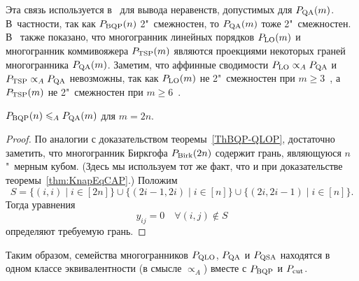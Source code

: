 Эта связь используется в~\cite{Kaibel:1997} для вывода неравенств, допустимых для $P_{\textup{QA}}(m)$.
В~частности, так как $P_{\textup{BQP}}(n)$ 2"~смежностен, то $P_{\textup{QA}}(m)$ тоже 2"~смежностен.
В~\cite{Kaibel:1997} также показано, что многогранник линейных порядков $P_{\textup{LO}}(m)$ и многогранник коммивояжера $P_{\textup{TSP}}(m)$ являются проекциями некоторых граней многогранника $P_{\textup{QA}}(m)$.
Заметим, что аффинные сводимости $P_{\textup{LO}} \propto_A P_{\textup{QA}}$ и $P_{\textup{TSP}} \propto_A P_{\textup{QA}}$ невозможны, так как $P_{\textup{LO}}(m)$ не 2"~смежностен при $m \ge 3$~\cite{Young:1978},
а $P_{\textup{TSP}}(m)$ не 2"~смежностен при $m \ge 6$~\cite{PadbergRao:1974}.

\begin{theorem}
	$P_{\textup{BQP}}(n) \leqslant_A P_{\textup{QA}}(m)$ для $m = 2n$.
\end{theorem} 

\begin{proof}
По аналогии с доказательством теоремы~\ref{ThBQP-QLOP}, достаточно заметить, что многогранник Биркгофа $P_{\textup{Birk}}(2n)$ содержит грань, являющуюся $n$"~мерным кубом.
(Здесь мы используем тот же факт, что и при доказательстве теоремы~\ref{thm:KnapEqCAP}.)
Положим
\[
S = \big\{(i,i) \mid i\in[2n]\big\} \cup \big\{(2i-1,2i) \mid i\in[n]\big\} \cup \big\{(2i,2i-1) \mid i\in[n]\big\}.
\] 
Тогда уравнения
\[
y_{ij} = 0 \quad \forall (i,j) \notin S
\]
определяют требуемую грань.
\end{proof}

Таким образом, семейства многогранников $P_{\textup{QLO}}$, $P_{\textup{QA}}$ и $P_{\textup{QSA}}$ находятся в одном классе эквивалентности (в смысле $\propto_A$) вместе с $P_{\textup{BQP}}$ и $P_{\textup{cut}}$.





